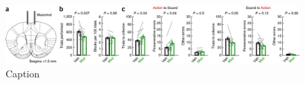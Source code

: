 \begin{figure}[htbp]

\begin{center}
\includegraphics[width=\textwidth]{Figures/NN_fig2.jpg} 
\end{center}

\caption[Bilateral inactivation of M2 impairs adjustment to sound rule]
{Caption}

\label{fig:NN_fig2}
\end{figure}